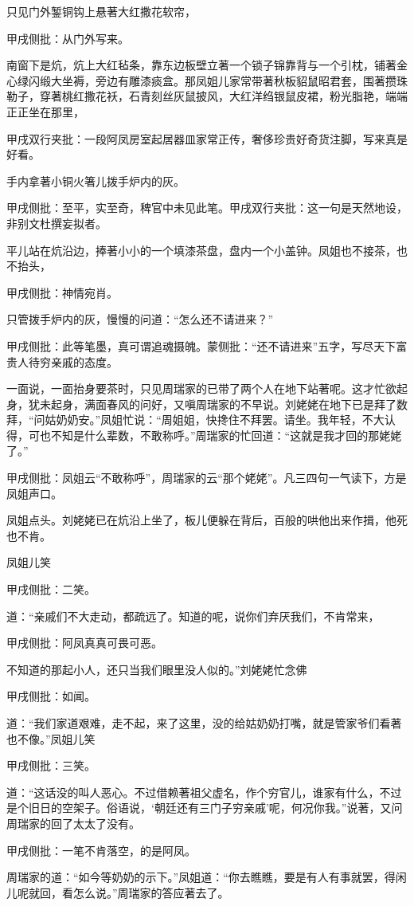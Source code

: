 \begin{parag}
    只见门外錾铜钩上悬著大红撒花软帘，\begin{note}甲戌侧批：从门外写来。\end{note}南窗下是炕，炕上大红毡条，靠东边板壁立著一个锁子锦靠背与一个引枕，铺著金心绿闪缎大坐褥，旁边有雕漆痰盒。那凤姐儿家常带著秋板貂鼠昭君套，围著攒珠勒子，穿著桃红撒花袄，石青刻丝灰鼠披风，大红洋绉银鼠皮裙，粉光脂艳，端端正正坐在那里，\begin{note}甲戌双行夹批：一段阿凤房室起居器皿家常正传，奢侈珍贵好奇货注脚，写来真是好看。\end{note}手内拿著小铜火箸儿拨手炉内的灰。\begin{note}甲戌侧批：至平，实至奇，稗官中未见此笔。甲戌双行夹批：这一句是天然地设，非别文杜撰妄拟者。\end{note}平儿站在炕沿边，捧著小小的一个填漆茶盘，盘内一个小盖钟。凤姐也不接茶，也不抬头，\begin{note}甲戌侧批：神情宛肖。\end{note}只管拨手炉内的灰，慢慢的问道：“怎么还不请进来？”\begin{note}甲戌侧批：此等笔墨，真可谓追魂摄魄。蒙侧批：“还不请进来”五字，写尽天下富贵人待穷亲戚的态度。\end{note}一面说，一面抬身要茶时，只见周瑞家的已带了两个人在地下站著呢。这才忙欲起身，犹未起身，满面春风的问好，又嗔周瑞家的不早说。刘姥姥在地下已是拜了数拜，“问姑奶奶安。”凤姐忙说：“周姐姐，快搀住不拜罢。请坐。我年轻，不大认得，可也不知是什么辈数，不敢称呼。”周瑞家的忙回道：“这就是我才回的那姥姥了。”\begin{note}甲戌侧批：凤姐云“不敢称呼”，周瑞家的云“那个姥姥”。凡三四句一气读下，方是凤姐声口。\end{note}凤姐点头。刘姥姥已在炕沿上坐了，板儿便躲在背后，百般的哄他出来作揖，他死也不肯。
\end{parag}


\begin{parag}
    凤姐儿笑\begin{note}甲戌侧批：二笑。\end{note}道：“亲戚们不大走动，都疏远了。知道的呢，说你们弃厌我们，不肯常来，\begin{note}甲戌侧批：阿凤真真可畏可恶。\end{note}不知道的那起小人，还只当我们眼里没人似的。”刘姥姥忙念佛\begin{note}甲戌侧批：如闻。\end{note}道：“我们家道艰难，走不起，来了这里，没的给姑奶奶打嘴，就是管家爷们看著也不像。”凤姐儿笑\begin{note}甲戌侧批：三笑。\end{note}道：“这话没的叫人恶心。不过借赖著祖父虚名，作个穷官儿，谁家有什么，不过是个旧日的空架子。俗语说，‘朝廷还有三门子穷亲戚’呢，何况你我。”说著，又问周瑞家的回了太太了没有。\begin{note}甲戌侧批：一笔不肯落空，的是阿凤。\end{note}周瑞家的道：“如今等奶奶的示下。”凤姐道：“你去瞧瞧，要是有人有事就罢，得闲儿呢就回，看怎么说。”周瑞家的答应著去了。
\end{parag}


